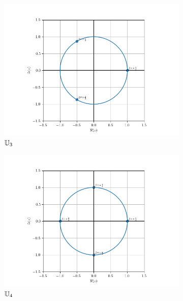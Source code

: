 \begin{figure}
  \begin{subfigure}{.3\textwidth}
    \centering
    \includegraphics[scale = 0.33]{U_3.png}
    \caption{$\mathbb{U}_3$}\label{fig:U3}
  \end{subfigure}
  \begin{subfigure}{.3\textwidth}
    \centering
    \includegraphics[scale = 0.33]{U_4.png}
    \caption{$\mathbb{U}_4$}\label{fig:U4}
  \end{subfigure}
  \begin{subfigure}{.3\textwidth}
    \centering

\end{subfigure}
\end{figure}
